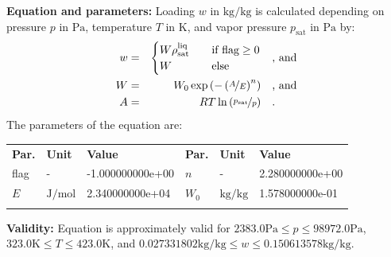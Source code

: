 \textbf{Equation and parameters:}
\newline
%
Loading $w$ in $\si{\kilogram\per\kilogram}$ is calculated depending on pressure $p$ in $\si{\pascal}$, temperature $T$ in $\si{\kelvin}$, and vapor pressure $p_\mathrm{sat}$ in $\si{\pascal}$ by:
%
\begin{equation*}
\begin{split}
w &=& \begin{cases} W \rho_\mathrm{sat}^{\mathrm{liq}} & \quad \text{if flag} \geq 0 \\ W & \quad \text{else} \end{cases} & \quad\text{, and} \\
W &=& W_0 \exp \left( - \left( \nicefrac{A}{E} \right) ^{n} \right) & \quad\text{, and} \\
A &=& R T \ln \left( \nicefrac{p_\mathrm{sat}}{p} \right) & \quad\text{.} \\
\end{split}
\end{equation*}
%
The parameters of the equation are:
%
\begin{longtable}[l]{lll|lll}
\toprule
\addlinespace
\textbf{Par.} & \textbf{Unit} & \textbf{Value} &	\textbf{Par.} & \textbf{Unit} & \textbf{Value} \\
\addlinespace
\midrule
\endhead

\bottomrule
\endfoot
\bottomrule
\endlastfoot
\addlinespace

flag & - & -1.000000000e+00 & $n$ & - & 2.280000000e+00 \\
$E$ & $\si{\joule\per\mole}$ & 2.340000000e+04 & $W_0$ & $\si{\kilogram\per\kilogram}$ & 1.578000000e-01 \\

\addlinespace\end{longtable}

\textbf{Validity:}
\newline
Equation is approximately valid for $2383.0 \si{\pascal} \leq p \leq 98972.0 \si{\pascal}$,  $323.0 \si{\kelvin} \leq T \leq 423.0 \si{\kelvin}$, and $0.027331802 \si{\kilogram\per\kilogram} \leq w \leq 0.150613578 \si{\kilogram\per\kilogram}$.
\newline

